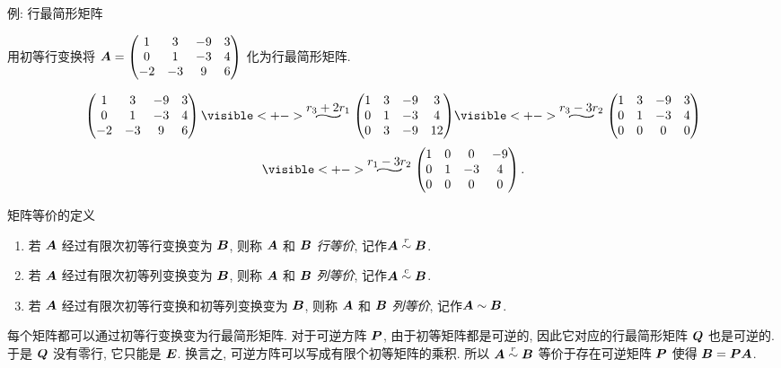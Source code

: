 \begin{frame}{例: 行最简形矩阵}
	\onslide<+->
	\begin{example}
		用初等行变换将 ${\boldsymbol{A}}=\begin{pmatrix}
			1&3&-9&3\\
			0&1&-3&4\\
			-2&-3&9&6
		\end{pmatrix}$ 化为行最简形矩阵.
	\end{example}
	\onslide<+->
	\begin{solution}
		\[\begin{pmatrix}
			1&3&-9&3\\
			0&1&-3&4\\
			-2&-3&9&6
		\end{pmatrix}
		\visible<+->{\wsim{r_3+2r_1}{}\begin{pmatrix}
			1&3&-9&3\\
			0&1&-3&4\\
			0&3&-9&12
		\end{pmatrix}}
		\visible<+->{\wsim{
			r_3-3r_2}{}\begin{pmatrix}
				1&3&-9&3\\
				0&1&-3&4\\
				0&0&0&0
		\end{pmatrix}}\]\[
		\visible<+->{\wsim{
			r_1-3r_2}{}\begin{pmatrix}
				1&0&0&-9\\
				0&1&-3&4\\
				0&0&0&0
		\end{pmatrix}.}
		\]
	\end{solution}
\end{frame}


\begin{frame}{矩阵等价的定义}
	\onslide<+->
	\begin{definition}[矩阵的等价]
		\begin{enumerate}
			\item 若 ${\boldsymbol{A}}$ 经过有限次初等行变换变为 ${\boldsymbol{B}}$, 则称 ${\boldsymbol{A}}$ 和 ${\boldsymbol{B}}$ \emph{行等价}, 记作\emph{${\boldsymbol{A}}\mathrel{\overset{r}{\sim}}{\boldsymbol{B}}$}.
			\item 若 ${\boldsymbol{A}}$ 经过有限次初等列变换变为 ${\boldsymbol{B}}$, 则称 ${\boldsymbol{A}}$ 和 ${\boldsymbol{B}}$ \emph{列等价}, 记作\emph{${\boldsymbol{A}}\mathrel{\overset{c}{\sim}}{\boldsymbol{B}}$}.
			\item 若 ${\boldsymbol{A}}$ 经过有限次初等行变换和初等列变换变为 ${\boldsymbol{B}}$, 则称 ${\boldsymbol{A}}$ 和 ${\boldsymbol{B}}$ \emph{列等价}, 记作\emph{${\boldsymbol{A}}\sim{\boldsymbol{B}}$}.
		\end{enumerate}
	\end{definition}
	\onslide<+->
	每个矩阵都可以通过初等行变换变为行最简形矩阵.
	\onslide<+->
	对于可逆方阵 ${\boldsymbol{P}}$, 由于初等矩阵都是可逆的, 因此它对应的行最简形矩阵 ${\boldsymbol{Q}}$ 也是可逆的.
	\onslide<+->
	于是 ${\boldsymbol{Q}}$ 没有零行, 它只能是 ${\boldsymbol{E}}$.
	\onslide<+->
	换言之, \alert{可逆方阵可以写成有限个初等矩阵的乘积}.
	\onslide<+->
	所以 ${\boldsymbol{A}}\mathrel{\overset{r}{\sim}}{\boldsymbol{B}}$ 等价于存在可逆矩阵 ${\boldsymbol{P}}$ 使得 ${\boldsymbol{B}}={\boldsymbol{P}}{\boldsymbol{A}}$.
\end{frame}


